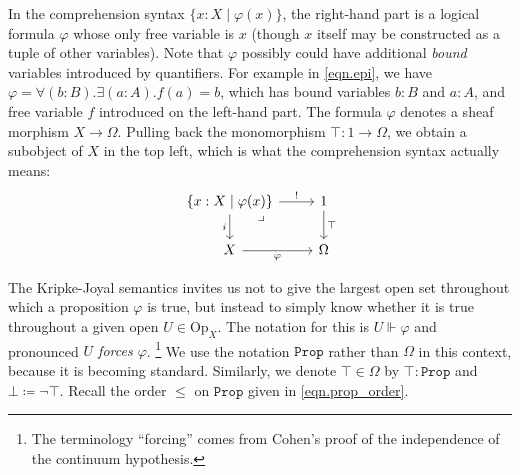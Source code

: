 \documentclass[11pt, oneside, article]{memoir}
\theoremstyle{plain}
\theoremstyle{definition}
\theoremstyle{remark}
\newcommand{\const}[1]{\mathtt{#1}}
\newcommand{\Set}[1]{\mathrm{#1}}
\newcommand{\forces}{\Vdash}
\newcommand{\prop}{\const{Prop}}
\newcommand{\Op}{\Set{Op}}
\newcommand{\true}{\top}
\newcommand{\false}{\bot}
\begin{document}
In the comprehension syntax $\{x:X\mid\varphi(x)\}$, the right-hand part is a logical formula $\varphi$ whose only free variable is $x$ (though $x$ itself may be constructed as a tuple of other variables). Note that $\varphi$ possibly could have additional \emph{bound} variables introduced by quantifiers. For example in \eqref{eqn.epi}, we have $\varphi=\forall (b:B).\exists(a:A). f(a)=b$, which has bound variables $b:B$ and $a:A$, and free variable $f$ introduced on the left-hand part. The formula $\varphi$ denotes a sheaf morphism $X\to\Omega$. Pulling back the monomorphism $\top\colon 1\to\Omega$, we obtain a subobject of $X$ in the top left, which is what the comprehension syntax actually means:
\[
\begin{tikzcd}
	\{x:X\mid\varphi(x)\}\ar[r, "!"]\ar[d, "i"']&
	1\ar[d, "\top"]\\
	X\ar[r, "\varphi"']&
	\Omega\ar[ul, phantom, very near end, "\lrcorner"]
\end{tikzcd}
\]

The Kripke-Joyal semantics invites us not to give the largest open set throughout which a proposition $\varphi$ is true, but instead to simply know whether it is true throughout a given open $U\in\Op_X$. The notation for this is $U\forces\varphi$ and pronounced \emph{$U$ forces $\varphi$}.%
\footnote{The terminology ``forcing'' comes from Cohen's proof of the independence of the continuum hypothesis.}
We use the notation $\prop$ rather than $\Omega$ in this context, because it is becoming standard. Similarly, we denote $\top\in\Omega$ by $\true:\prop$ and $\false\coloneqq\neg\true$. Recall the order $\leq$ on $\prop$ given in \eqref{eqn.prop_order}.
\end{document}

